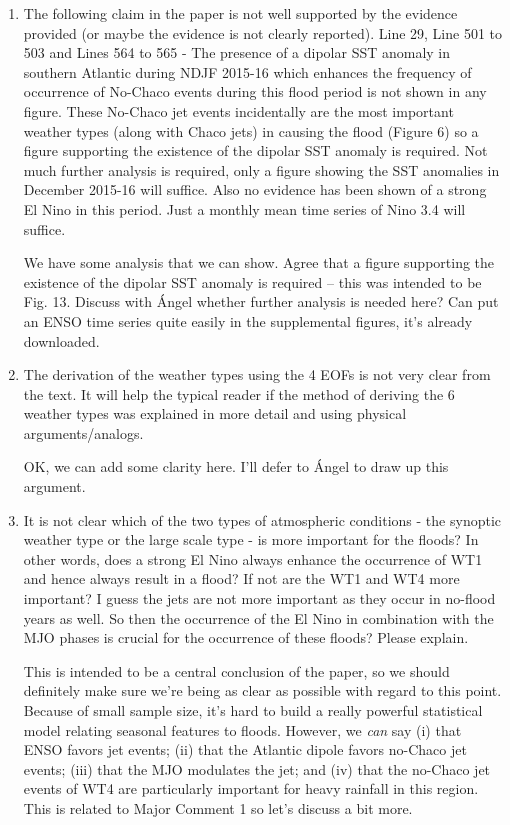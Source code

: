 \documentclass{article}
\newenvironment{answer}{\begin{mdframed}}{\end{mdframed}}
\begin{document}
\begin{enumerate}
	\item The following claim in the paper is not well supported by the evidence provided (or maybe the evidence is not clearly reported).
	Line 29, Line 501 to 503 and Lines 564 to 565 - The presence of a dipolar SST anomaly in southern Atlantic during NDJF 2015-16 which enhances the frequency of occurrence of No-Chaco events during this flood period is not shown in any figure. These No-Chaco jet events incidentally are the most important weather types (along with Chaco jets) in causing the flood (Figure 6) so a figure supporting the existence of the dipolar SST anomaly is required.
	Not much further analysis is required, only a figure showing the SST anomalies in December 2015-16 will suffice.
	Also no evidence has been shown of a strong El Nino in this period. Just a monthly mean time series of Nino 3.4 will suffice.
	\begin{answer}
		We have some analysis that we can show.
		Agree that a figure supporting the existence of the dipolar SST anomaly is required -- this was intended to be Fig. 13.
		Discuss with \'{A}ngel whether further analysis is needed here?
		Can put an ENSO time series quite easily in the supplemental figures, it's already downloaded.
	\end{answer}

	\item The derivation of the weather types using the 4 EOFs is not very clear from the text. It will help the typical reader if the method of deriving the 6 weather types was explained in more detail and using physical arguments/analogs.
	\begin{answer}
		OK, we can add some clarity here.
		I'll defer to \'{A}ngel to draw up this argument.
	\end{answer}

	\item It is not clear which of the two types of atmospheric conditions - the synoptic weather type or the large scale type - is more important for the floods? In other words, does a strong El Nino always enhance the occurrence of WT1 and hence always result in a flood? If not are the  WT1 and WT4 more important? I guess the jets are not more important as they occur in no-flood years as well. So then the occurrence of the El Nino in combination with the MJO phases is crucial for the occurrence of these floods? Please explain.
	\begin{answer}
		This is intended to be a central conclusion of the paper, so we should definitely make sure we're being as clear as possible with regard to this point.
		Because of small sample size, it's hard to build a really powerful statistical model relating seasonal features to floods.
		However, we \emph{can} say (i) that ENSO favors jet events; (ii) that the Atlantic dipole favors no-Chaco jet events; (iii) that the MJO modulates the jet; and (iv) that the no-Chaco jet events of WT4 are particularly important for heavy rainfall in this region.
		This is related to Major Comment 1 so let's discuss a bit more.
	\end{answer}
\end{enumerate}
\end{document}
